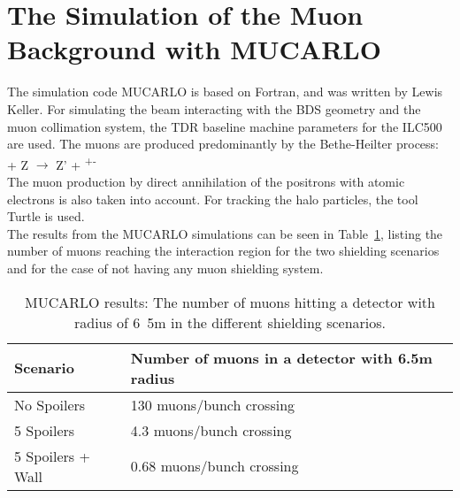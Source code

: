 \section{The Simulation of the Muon Background with MUCARLO}
\label{MUCARLO}

The simulation code MUCARLO is based on Fortran, and was written by Lewis Keller.
For simulating the beam interacting with the BDS geometry and the muon collimation system, the TDR baseline machine parameters for the ILC500 are used.
The muons are produced predominantly by the Bethe-Heilter process:\\
\textgamma + Z $\rightarrow$ Z' + \murm\textsuperscript{+}\murm\textsuperscript{-}\\
The muon production by direct annihilation of the positrons with atomic electrons is also taken into account.
For tracking the halo particles, the tool Turtle is used.\\
The results from the MUCARLO simulations can be seen in Table~\ref{tab:MuonRates}, listing the number of muons reaching the interaction region for the two shielding scenarios and for the case of not having any muon shielding system.

\begin{table}
\caption{MUCARLO results: The number of muons hitting a detector with radius of \unit{6.5}{m} in the different shielding scenarios.}
\label{tab:MuonRates}
\centering
\begin{tabularx}{\textwidth}{ll}
\hline\hline
\textbf{Scenario} & \textbf{Number of muons in a detector with 6.5m radius}\\
\hline
\cline{1-2}
\hline
 No Spoilers & 130 muons/bunch crossing\\
 5 Spoilers& 4.3 muons/bunch crossing\\
 5 Spoilers + Wall & 0.68 muons/bunch crossing\\
\hline\hline
\end{tabularx}
\end{table}